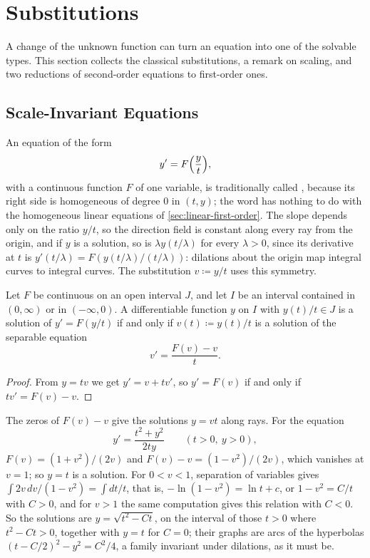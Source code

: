 \section{Substitutions}
\label{sec:substitutions}

A change of the unknown function can turn an equation into one of the solvable types. This section collects the classical substitutions, a remark on scaling, and two reductions of second-order equations to first-order ones.

\subsection{Scale-Invariant Equations}

An equation of the form
\[
y'=F\Bigl(\frac yt\Bigr),
\]
with a continuous function $F$ of one variable, is traditionally called , because its right side is homogeneous of degree $0$ in $(t,y)$; the word has nothing to do with the homogeneous linear equations of \cref{sec:linear-first-order}. The slope depends only on the ratio $y/t$, so the direction field is constant along every ray from the origin, and if $y$ is a solution, so is $\lambda y(t/\lambda)$ for every $\lambda>0$, since its derivative at $t$ is $y'(t/\lambda)=F(y(t/\lambda)/(t/\lambda))$: dilations about the origin map integral curves to integral curves. The substitution $v\coloneqq y/t$ uses this symmetry.

\begin{proposition}
\label{prop:homogeneous-equation}
Let $F$ be continuous on an open interval $J$, and let $I$ be an interval contained in $(0,\infty)$ or in $(-\infty,0)$. A differentiable function $y$ on $I$ with $y(t)/t\in J$ is a solution of $y'=F(y/t)$ if and only if $v(t)\coloneqq y(t)/t$ is a solution of the separable equation
\[
v'=\frac{F(v)-v}t .
\]
\end{proposition}

\begin{proof}
From $y=tv$ we get $y'=v+tv'$, so $y'=F(v)$ if and only if $tv'=F(v)-v$.
\end{proof}

The zeros of $F(v)-v$ give the solutions $y=vt$ along rays. For the equation
\[
y'=\frac{t^2+y^2}{2ty}\qquad(t>0,\ y>0),
\]
$F(v)=(1+v^2)/(2v)$ and $F(v)-v=(1-v^2)/(2v)$, which vanishes at $v=1$; so $y=t$ is a solution. For $0<v<1$, separation of variables gives $\int2v\,dv/(1-v^2)=\int dt/t$, that is, $-\ln(1-v^2)=\ln t+c$, or $1-v^2=C/t$ with $C>0$, and for $v>1$ the same computation gives this relation with $C<0$. So the solutions are $y=\sqrt{t^2-Ct}$, on the interval of those $t>0$ where $t^2-Ct>0$, together with $y=t$ for $C=0$; their graphs are arcs of the hyperbolas $(t-C/2)^2-y^2=C^2/4$, a family invariant under dilations, as it must be.

